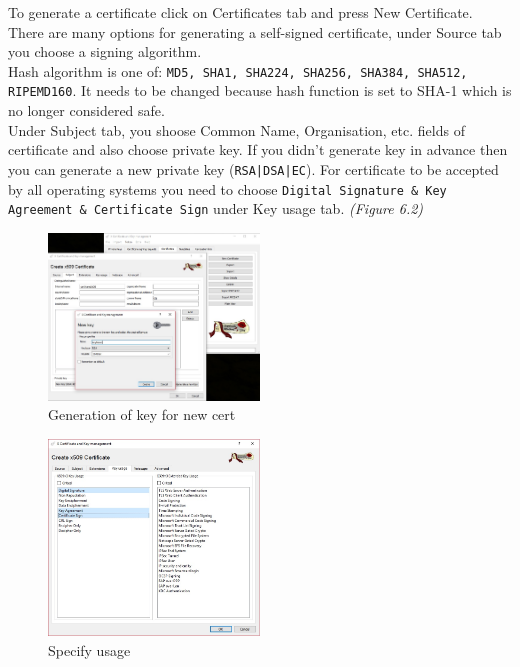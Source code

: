 \documentclass[10pt, a4paper]{report}
\begin{document}
To generate a certificate click on Certificates tab and press New Certificate. There are many options for generating a self-signed certificate, under Source tab you choose a signing algorithm.  \\


Hash algorithm is one of: \verb+MD5, SHA1, SHA224, SHA256, SHA384, SHA512, RIPEMD160+. It needs to be changed because hash function is set to SHA-1 which is no longer considered safe.  \\


Under Subject tab, you shoose Common Name, Organisation, etc. fields of certificate and also choose private key. If you didn't generate key in advance then you can generate a new private key (\verb+RSA|DSA|EC+). For certificate to be accepted by all operating systems you need to choose \verb+Digital Signature & Key Agreement & Certificate Sign+ under Key usage tab. \textit{(Figure 6.2)}


\begin{figure}[!ht]
 \caption{Generation of key for new cert}
 \centering
  \includegraphics[width=0.5\textwidth]{../Dependancies/XCA/genKey.jpg}
\end{figure}

\begin{figure}[!ht]
 \caption{Specify usage}
 \centering
  \includegraphics[width=0.5\textwidth]{../Dependancies/XCA/genKey_specif.jpg}
\end{figure}
\end{document}
